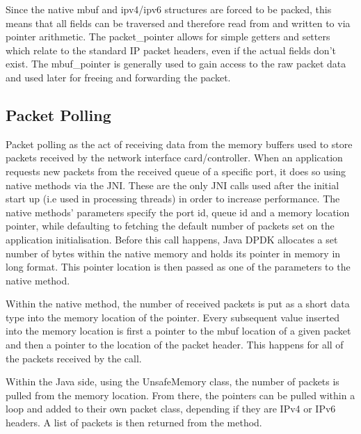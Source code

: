 \documentclass[final_report.tex]{subfiles}
\begin{document}
Since the native mbuf and ipv4/ipv6 structures are forced to be packed,  this means that all fields can be traversed and therefore read from and written to via pointer arithmetic. The packet\_pointer allows for simple getters and setters which relate to the standard IP packet headers, even if the actual fields don't exist. The mbuf\_pointer is generally used to gain access to the raw packet data and used later for freeing and forwarding the packet.

\subsection{Packet Polling}
Packet polling as the act of receiving data from the memory buffers used to store packets received by the network interface card/controller. When an application requests new packets from the received queue of a specific port, it does so using native methods via the JNI. These are the only JNI calls used after the initial start up (i.e used in processing threads) in order to increase performance. The native methods' parameters specify the port id, queue id and a memory location pointer, while defaulting to fetching the default number of packets set on the application initialisation. Before this call happens, Java DPDK allocates a set number of bytes within the native memory and holds its pointer in memory in long format. This pointer location is then passed as one of the parameters to the native method.


Within the native method, the number of received packets is put as a short data type into the memory location of the pointer. Every subsequent value inserted into the memory location is first a pointer to the mbuf location of a given packet and then a pointer to the location of the packet header. This happens for all of the packets received by the call.

Within the Java side, using the UnsafeMemory class, the number of packets is pulled from the memory location. From there, the pointers can be pulled within a loop and added to their own packet class, depending if they are IPv4 or IPv6 headers. A list of packets is then returned from the method.
\end{document}
